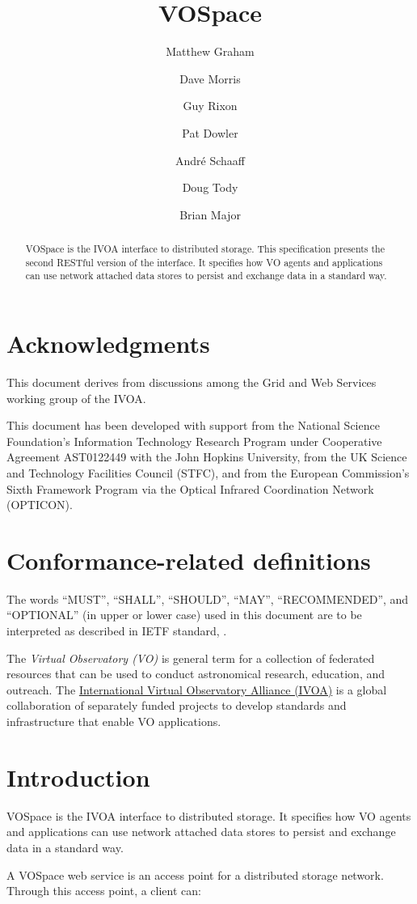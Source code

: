 \documentclass[11pt,a4paper]{ivoa}
\title{VOSpace}
\author{Matthew Graham}
\author{Dave Morris}
\author{Guy Rixon}
\author{Pat Dowler}
\author{Andr\'e Schaaff}
\author{Doug Tody}
\author{Brian Major}
\begin{document}
\begin{abstract}
VOSpace is the IVOA interface to distributed storage. This specification presents the second RESTful version of the interface.  It specifies how VO agents and applications can use network attached data stores to persist and exchange data in a standard way.
\end{abstract}

\section*{Acknowledgments}
\label{sec:acknowledgments}
This document derives from discussions among the Grid and Web Services working group of the IVOA.

This document has been developed with support from the National Science Foundation's Information Technology Research Program under Cooperative Agreement AST0122449 with the John Hopkins University, from the UK Science and Technology Facilities Council (STFC), and from the European Commission's Sixth Framework Program via the Optical Infrared Coordination Network (OPTICON).

\section*{Conformance-related definitions}
\label{sec:conformance-related definitions}
The words ``MUST'', ``SHALL'', ``SHOULD'', ``MAY'', ``RECOMMENDED'', and
``OPTIONAL'' (in upper or lower case) used in this document are to be
interpreted as described in IETF standard, \citep{std:RFC2119}.

The \emph{Virtual Observatory (VO)} is
general term for a collection of federated resources that can be used
to conduct astronomical research, education, and outreach.
The \href{http://www.ivoa.net}{International
Virtual Observatory Alliance (IVOA)} is a global
collaboration of separately funded projects to develop standards and
infrastructure that enable VO applications.

\section{Introduction}
\label{sec:introduction}
VOSpace is the IVOA interface to distributed storage. It specifies how VO agents and applications can use network attached data stores to persist and exchange data in a standard way.

A VOSpace web service is an access point for a distributed storage network. Through this access point, a client can:
\end{document}
